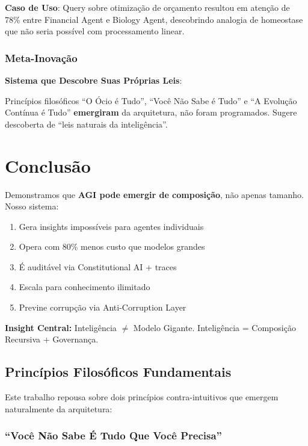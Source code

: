 \documentclass[11pt]{article}
\begin{document}
\textbf{Caso de Uso}: Query sobre otimização de orçamento resultou em atenção de 78\% entre Financial Agent e Biology Agent, descobrindo analogia de homeostase que não seria possível com processamento linear.

\subsubsection{Meta-Inovação}

\textbf{Sistema que Descobre Suas Próprias Leis}:

Princípios filosóficos ``O Ócio é Tudo'', ``Você Não Sabe é Tudo'' e ``A Evolução Contínua é Tudo'' \textbf{emergiram} da arquitetura, não foram programados. Sugere descoberta de ``leis naturais da inteligência''.

\section{Conclusão}

Demonstramos que \textbf{AGI pode emergir de composição}, não apenas tamanho. Nosso sistema:

\begin{enumerate}
    \item Gera insights impossíveis para agentes individuais
    \item Opera com 80\% menos custo que modelos grandes
    \item É auditável via Constitutional AI + traces
    \item Escala para conhecimento ilimitado
    \item Previne corrupção via Anti-Corruption Layer
\end{enumerate}

\textbf{Insight Central:} Inteligência $\neq$ Modelo Gigante. Inteligência = Composição Recursiva + Governança.

\subsection{Princípios Filosóficos Fundamentais}

Este trabalho repousa sobre dois princípios contra-intuitivos que emergem naturalmente da arquitetura:

\subsubsection{``Você Não Sabe É Tudo Que Você Precisa''}
\end{document}
